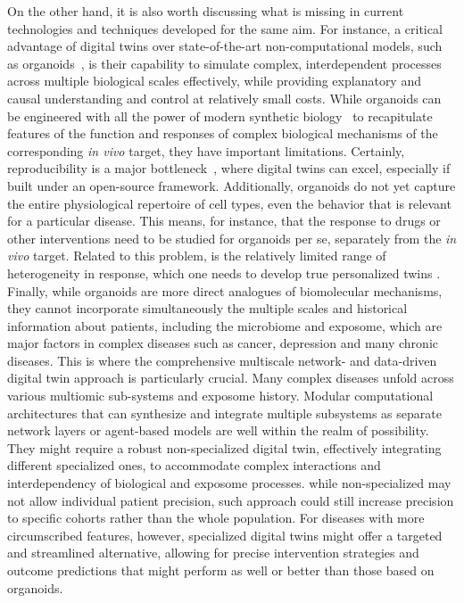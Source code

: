 \documentclass[12pt]{article}
\renewcommand{\(}{\left(}
\renewcommand{\)}{\right)}
\renewcommand{\[}{\left[}
\renewcommand{\]}{\right]}
\begin{document}
On the other hand, it is also worth discussing what is missing in current technologies and techniques developed for the same aim. For instance, a critical advantage of digital twins over
state-of-the-art non-computational models, such as organoids~\cite{corro2020brief}, is their capability to simulate complex, interdependent processes across multiple biological scales effectively, while providing explanatory and causal understanding and control at relatively small costs. 
%
While organoids can be engineered with all the power of modern synthetic biology~\cite{hofer2021engineering} to recapitulate features of the function and responses of complex biological mechanisms of the corresponding \emph{in vivo} target, they have important limitations.
%
Certainly, reproducibility is a major bottleneck~\cite{zhao2022organoids}, where digital twins can excel, especially if built under an open-source framework.
%
Additionally, organoids do not yet capture the entire physiological repertoire of cell types, even the behavior that is relevant for a particular disease. This means, for instance, that the response to drugs or other interventions need to be studied for organoids per se, separately from the \emph{in vivo} target. Related to this problem, is the relatively limited range of heterogeneity in response, which one needs to develop true personalized twins \cite{zhao2022organoids}.
%
Finally, while organoids are more direct analogues of biomolecular mechanisms, they cannot incorporate  simultaneously the multiple scales and historical information about patients, including the microbiome and exposome, which are major factors in complex diseases such as cancer, depression and many chronic diseases.
%
This is where the comprehensive multiscale network- and data-driven digital twin approach is particularly crucial.
%
Many complex diseases unfold across various multiomic sub-systems and exposome history.
%
Modular computational architectures that can synthesize and integrate multiple subsystems as separate network layers or agent-based models are well within the realm of possibility.
%
They might require a robust non-specialized digital twin, effectively integrating different specialized ones, to accommodate complex interactions and interdependency of biological and exposome processes. 
%
while non-specialized may not allow individual patient precision, such approach could still increase precision to specific cohorts rather than the whole population. 
%
For diseases with more circumscribed features, however, specialized digital twins might offer a targeted and streamlined alternative, allowing for precise intervention strategies and outcome predictions that might perform as well or better than those based on organoids.
\end{document}
